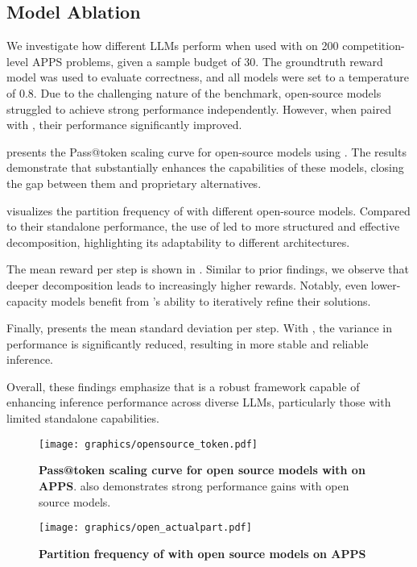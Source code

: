 \subsection{Model Ablation}
\label{sec:model_ablation}

We investigate how different LLMs perform when used with \decomp on 200 competition-level APPS problems, given a sample budget of 30. The groundtruth reward model was used to evaluate correctness, and all models were set to a temperature of 0.8. Due to the challenging nature of the benchmark, open-source models struggled to achieve strong performance independently. However, when paired with \decomp, their performance significantly improved.

 presents the Pass@token scaling curve for open-source models using \decomp. The results demonstrate that \decomp substantially enhances the capabilities of these models, closing the gap between them and proprietary alternatives.

 visualizes the partition frequency of \decomp with different open-source models. Compared to their standalone performance, the use of \decomp led to more structured and effective decomposition, highlighting its adaptability to different architectures.

The mean reward per step is shown in . Similar to prior findings, we observe that deeper decomposition leads to increasingly higher rewards. Notably, even lower-capacity models benefit from \decomp’s ability to iteratively refine their solutions.

Finally,  presents the mean standard deviation per step. With \decomp, the variance in performance is significantly reduced, resulting in more stable and reliable inference.

Overall, these findings emphasize that \decomp is a robust framework capable of enhancing inference performance across diverse LLMs, particularly those with limited standalone capabilities.

\begin{figure}[ht]
    \centering
    \texttt{[image: graphics/opensource\_token.pdf]}
    \caption{\textbf{Pass@token scaling curve for open source models with \decomp on APPS}. \decomp also demonstrates strong performance gains with open source models.}
    \label{fig:opensource_token}
\end{figure}

\begin{figure}[ht]
    \centering
    \texttt{[image: graphics/open\_actualpart.pdf]}
    \caption{\textbf{Partition frequency of \decomp with open source models on APPS}}
    \label{fig:open_actualpart}
\end{figure}

